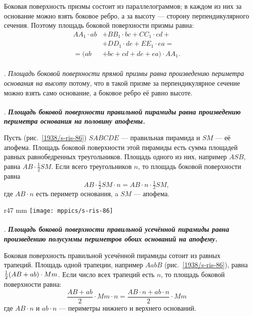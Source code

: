 Боковая поверхность призмы состоит из параллелограммов;
в каждом из них за основание можно взять боковое ребро, а за высоту — сторону перпендикулярного сечения.
Поэтому площадь боковой поверхности призмы равна:
\begin{align*}
AA_1\cdot ab
&+ BB_1\cdot bc+CC_1\cdot cd+
\\
&+DD_1\cdot de+EE_1\cdot ea=
\\
=(ab&+ bc+ cd+ de+ ea)\cdot AA_1.
\end{align*}


\paragraph{}\label{1938/s79}
\mbox{.}
\emph{Площадь боковой поверхности прямой призмы равна произведению периметра основания на высоту} потому, что в такой призме за перпендикулярное сечение можно взять само основание, а боковое ребро её равно высоте.

\paragraph{}\label{1938/s80}
.
\textbf{\emph{Площадь боковой поверхности правильной пирамиды равна произведению периметра основания на половину апофемы.}}

Пусть (рис.~\ref{1938/s-ris-86}) $SABCDE$ — правильная пирамида и $SM$ — её апофема.
Площадь боковой поверхности этой пирамиды есть сумма площадей равных равнобедренных треугольников.
Площадь одного из них, например $ASB$, равна $AB\cdot\tfrac12SM$.
Если всего треугольников $n$, то площадь боковой поверхности равна 
\[AB\cdot\tfrac12SM\cdot n= AB\cdot n\cdot\tfrac12SM,\]
где $AB\cdot n$ есть периметр основания, a $SM$ — апофема.

{

\begin{wrapfigure}{r}{47 mm}
\vskip-4mm
\centering
\texttt{[image: mppics/s-ris-86]}
\caption{}\label{1938/s-ris-86}
\vskip-0mm
\end{wrapfigure}

\paragraph{}\label{1938/s81}
\mbox{.}
\textbf{\emph{Площадь боковой поверхности правильной усечённой пирамиды равна произведению полусуммы периметров обоих оснований на апофему.}}

Боковая поверхность правильной усечённой пирамиды сотоит из равных трапеций.
Площадь одной трапеции, например $AabB$ (рис.~\ref{1938/s-ris-86}), равна $\tfrac12(AB \z+ ab)\cdot Mm$.
Если число всех трапеций есть $n$, то площадь боковой поверхности равна:
\[\frac{AB+ab}{2}\cdot Mm\cdot n=\frac{AB\cdot n+ab\cdot n}{2}\cdot Mm\]
где $AB\cdot n$ и $ab\cdot n$ — периметры нижнего и верхнего оснований.

}


